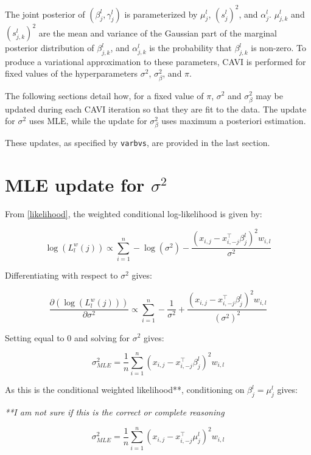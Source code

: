 \documentclass[twoside]{article}
\newcommand{\1}{\\[1ex]}
\newcommand{\2}{\\[2ex]}
\newcommand{\3}{\\[3ex]}
\newcommand{\4}{\\[4ex]}
\begin{document}
The joint posterior of $(\beta_j^l,\gamma_j^l)$ is parameterized by $\mu_j^l$, $(s_j^l)^2$, and $\alpha^l_j$. $\mu_{j,k}^l$ and $(s_{j,k}^l)^2$ are the mean and variance of the Gaussian part of the marginal posterior distribution of $\beta_{j,k}^l$, and $\alpha_{j,k}^l$ is the probability that $\beta_{j,k}^l$ is non-zero. To produce a variational approximation to these parameters, CAVI is performed for fixed values of the hyperparameters $\sigma^2$, $\sigma^2_\beta$, and $\pi$.

The following sections detail how, for a fixed value of $\pi$, $\sigma^2$ and $\sigma^2_\beta$ may be updated during each CAVI iteration so that they are fit to the data. The update for $\sigma^2$ uses MLE, while the update for $\sigma^2_\beta$ uses maximum a posteriori estimation. 

These updates, as specified by \texttt{varbvs}, are provided in the last section. 

\section{MLE update for $\sigma^2$}

From \eqref{likelihood}, the weighted conditional log-likelihood is given by: 

\begin{equation}
\log(L_l^w(j))\propto \sum_{i = 1}^n -\log(\sigma^2) - \frac{(x_{i,j} - x^\top_{i,-j}\beta_j^l)^2w_{i,l}}{\sigma^2}
\end{equation}

Differentiating with respect to $\sigma^2$ gives:

\begin{equation}
\frac{\partial(\log(L_l^w(j)))}{\partial\sigma^2} \propto \sum_{i = 1}^n - \frac{1}{\sigma^2} + \frac{(x_{i,j} - x^\top_{i,-j}\beta_j^l)^2w_{i,l}}{(\sigma^2)^2}
\end{equation}

Setting equal to 0 and solving for $\sigma^2$ gives:

\begin{equation}
\sigma^2_{\textit{MLE}} = \frac1{n}\sum_{i = 1}^n (x_{i,j} - x^\top_{i,-j}\beta_j^l)^2w_{i,l}
\end{equation}

As this is the conditional weighted likelihood**, conditioning on $\beta_j^l = \mu_j^l$ gives: 

\textit{**I am not sure if this is the correct or complete reasoning}

\begin{equation}
\sigma^2_{\textit{MLE}} = \frac1{n}\sum_{i = 1}^n (x_{i,j} - x^\top_{i,-j}\mu_j^l)^2w_{i,l}
\end{equation}
\end{document}
